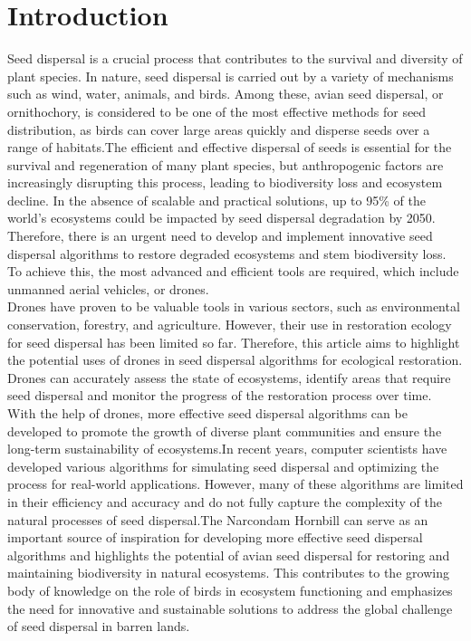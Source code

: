 \documentclass[conference]{IEEEtran}
\begin{document}
\section{Introduction}
Seed dispersal is a crucial process that contributes to the survival and diversity of plant species. In nature, seed dispersal is carried out by a variety of mechanisms such as wind, water, animals, and birds. Among these, avian seed dispersal, or ornithochory, is considered to be one of the most effective methods for seed distribution, as birds can cover large areas quickly and disperse seeds over a range of habitats.The efficient and effective dispersal of seeds is essential for the survival and regeneration of many plant species, but anthropogenic factors are increasingly disrupting this process, leading to biodiversity loss and ecosystem decline. In the absence of scalable and practical solutions, up to 95\% of the world's ecosystems could be impacted by seed dispersal degradation by 2050. Therefore, there is an urgent need to develop and implement innovative seed dispersal algorithms to restore degraded ecosystems\cite{1} and stem biodiversity loss. To achieve this, the most advanced and efficient tools are required, which include unmanned aerial vehicles, or drones. 
\\Drones have proven to be valuable tools in various sectors, such as environmental conservation, forestry, and agriculture\cite{2}. However, their use in restoration ecology for seed dispersal has been limited so far. Therefore, this article aims to highlight the potential uses of drones in seed dispersal algorithms for ecological restoration. Drones can accurately assess the state of ecosystems, identify areas that require seed dispersal and monitor the progress of the restoration process over time\cite{3}. With the help of drones, more effective seed dispersal algorithms can be developed to promote the growth of diverse plant communities and ensure the long-term sustainability of ecosystems.In recent years, computer scientists have developed various algorithms for simulating seed dispersal and optimizing the process for real-world applications. However, many of these algorithms are limited in their efficiency and accuracy and do not fully capture the complexity of the natural processes of seed dispersal.The Narcondam Hornbill can serve as an important source of inspiration for developing more effective seed dispersal algorithms and highlights the potential of avian seed dispersal for restoring and maintaining biodiversity in natural ecosystems. This contributes to the growing body of knowledge on the role of birds in ecosystem functioning and emphasizes the need for innovative and sustainable solutions to address the global challenge of seed dispersal in barren lands.
\end{document}
